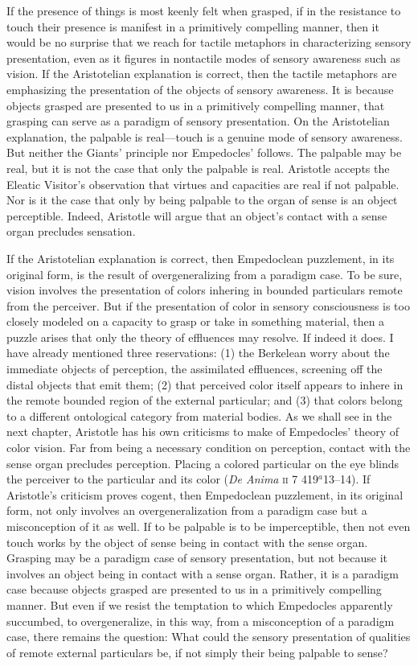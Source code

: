 If the presence of things is most keenly felt when grasped, if in the resistance to touch their presence is manifest in a primitively compelling manner, then it would be no surprise that we reach for tactile metaphors in characterizing sensory presentation, even as it figures in nontactile modes of sensory awareness such as vision. If the Aristotelian explanation is correct, then the tactile metaphors are emphasizing the presentation of the objects of sensory awareness. It is because objects grasped are presented to us in a primitively compelling manner, that grasping can serve as a paradigm of sensory presentation. On the Aristotelian explanation, the palpable is real---touch is a genuine mode of sensory awareness. But neither the Giants' principle nor Empedocles' follows. The palpable may be real, but it is not the case that only the palpable is real. Aristotle accepts the Eleatic Visitor's observation that virtues and capacities are real if not palpable. Nor is it the case that only by being palpable to the organ of sense is an object perceptible. Indeed, Aristotle will argue that an object's contact with a sense organ precludes sensation.

If the Aristotelian explanation is correct, then Empedoclean puzzlement, in its original form, is the result of overgeneralizing from a paradigm case. To be sure, vision involves the presentation of colors inhering in bounded particulars remote from the perceiver. But if the presentation of color in sensory consciousness is too closely modeled on a capacity to grasp or take in something material, then a puzzle arises that only the theory of effluences may resolve. If indeed it does. I have already mentioned three reservations: (1) the Berkelean worry about the immediate objects of perception, the assimilated effluences, screening off the distal objects that emit them; (2) that perceived color itself appears to inhere in the remote bounded region of the external particular; and (3) that colors belong to a different ontological category from material bodies. As we shall see in the next chapter, Aristotle has his own criticisms to make of Empedocles' theory of color vision. Far from being a necessary condition on perception, contact with the sense organ precludes perception. Placing a colored particular on the eye blinds the perceiver to the particular and its color (\emph{De Anima} \textsc{ii} 7 419\( ^{a} \)13--14). If Aristotle's criticism proves cogent, then Empedoclean puzzlement, in its original form, not only involves an overgeneralization from a paradigm case but a misconception of it as well. If to be palpable is to be imperceptible, then not even touch works by the object of sense being in contact with the sense organ. Grasping may be a paradigm case of sensory presentation, but not because it involves an object being in contact with a sense organ. Rather, it is a paradigm case because objects grasped are presented to us in a primitively compelling manner. But even if we resist the temptation to which Empedocles apparently succumbed, to overgeneralize, in this way, from a misconception of a paradigm case, there remains the question: What could the sensory presentation of qualities of remote external particulars be, if not simply their being palpable to sense?

